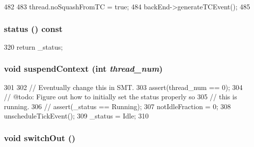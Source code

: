 \begin{DoxyCode}
482 {
483     thread.noSquashFromTC = true;
484     backEnd->generateTCEvent();
485 }
\end{DoxyCode}
\hypertarget{classOzoneCPU_a2ad9e92a82d6f783b3061584729c2f4a}{
\subsubsection[{status}]{ status () const}}
\label{classOzoneCPU_a2ad9e92a82d6f783b3061584729c2f4a}



\begin{DoxyCode}
320 { return _status; }
\end{DoxyCode}
\hypertarget{classOzoneCPU_ad5581eb9bb3abf5f320e3a7d43485601}{
\subsubsection[{suspendContext}]{\setlength{\rightskip}{0pt plus 5cm}void suspendContext (int {\em thread\_\-num})}}
\label{classOzoneCPU_ad5581eb9bb3abf5f320e3a7d43485601}



\begin{DoxyCode}
301 {
302     // Eventually change this in SMT.
303     assert(thread_num == 0);
304     // @todo: Figure out how to initially set the status properly so
305     // this is running.
306 //    assert(_status == Running);
307     notIdleFraction = 0;
308     unscheduleTickEvent();
309     _status = Idle;
310 }
\end{DoxyCode}
\hypertarget{classOzoneCPU_a05f299b443f8cc73a93d61572edc0218}{
\subsubsection[{switchOut}]{\setlength{\rightskip}{0pt plus 5cm}void switchOut ()}}
\label{classOzoneCPU_a05f299b443f8cc73a93d61572edc0218}



